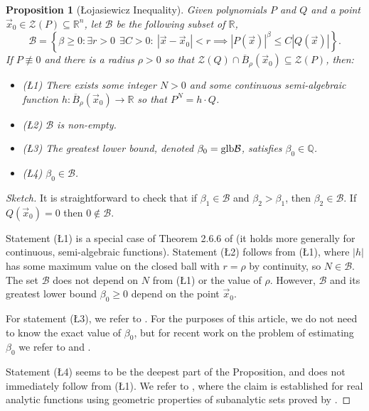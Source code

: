 \documentclass[12pt]{amsart}
\newtheorem{prop}[thm]{Proposition}
\theoremstyle{definition}
\theoremstyle{remark}
\numberwithin{equation}{section}
\newcommand{\re}{\mathbb{R}}
\newcommand{\qu}{\mathbb{Q}}
\newcommand{\vv}{\mathcal{Z}}
\newcommand{\Bb}{\mathcal{B}}
\newcommand{\glb}{\mbox{\rm glb}}
\begin{document}
\begin{prop}[\L ojasiewicz Inequality]\label{prop6.1}
  Given polynomials $P$ and $Q$ and a point $\vec x_0\in\vv(P)\subseteq\re^n$,
  let $\Bb$ be the following subset of $\re$,
  \begin{equation}\label{eq6.3}
  \Bb=\left\{\beta\ge0:\exists r>0\ \ \exists C>0 : \  |\vec x-\vec x_0|<r\implies|P(\vec x)|^\beta\le C\left|Q(\vec x)\right|\right\}.\nonumber
 \end{equation}
 If $P\not\equiv0$ and there is a radius $\rho>0$ so that $\vv(Q)\cap\overline B_\rho(\vec x_0)\subseteq\vv(P)$, then:
  \begin{itemize}
    \item {\rm{(\L1)}} There exists some integer $N>0$ and some continuous semi-algebraic function $h:\overline B_\rho(\vec x_0)\to\re$ so that $P^N=h\cdot Q$.
    \item {\rm{(\L2)}} $\Bb$ is non-empty.
   \item {\rm{(\L3)}} The greatest lower bound, denoted $\beta_0=\glb\Bb$, satisfies $\beta_0\in\qu$. %
    \item {\rm{(\L4)}} $\beta_0\in\Bb$.
  \end{itemize}
\end{prop}
\begin{proof}[Sketch]
  It is straightforward to check that if $\beta_1\in\Bb$ and $\beta_2>\beta_1$, then $\beta_2\in\Bb$.  If $Q(\vec x_0)=0$ then $0\notin\Bb$.

  Statement (\L1) is a special case of Theorem 2.6.6 of \cite{bcr} (it holds more generally for continuous, semi-algebraic functions).  Statement (\L2) follows from (\L1), where $|h|$ has some maximum value on the closed ball with $r=\rho$ by continuity, so $N\in\Bb$.  The set $\Bb$ does not depend on $N$ from (\L 1) or the value of $\rho$.  However, $\Bb$ and its greatest lower bound $\beta_0\ge0$ depend on the point $\vec x_0$.  

  For statement (\L3), we refer to \cite{br}.  For the purposes of this article, we do not need to know the exact value of $\beta_0$, but for recent work on the problem of estimating $\beta_0$ we refer to \cite{bmn} and \cite{ouss}.

  Statement (\L4) seems to be the deepest part of the Proposition, and does not immediately follow from (\L1).  We refer to \cite{s}, where the claim is established for real analytic functions using geometric properties of subanalytic sets proved by \cite{p}.
\end{proof}
\end{document}
